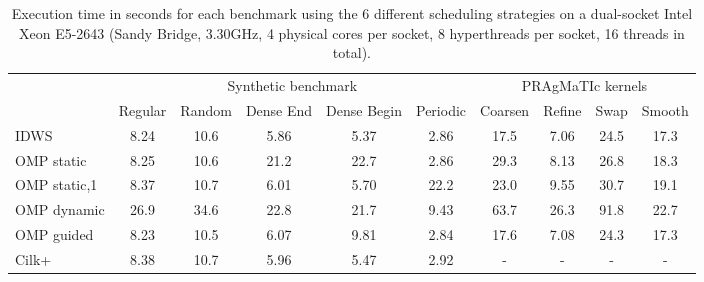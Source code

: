 \documentclass{acm_proc_article-sp}
\newcommand{\PRAGMATIC}{PRAgMaTIc\xspace}
\begin{document}
\begin{table*}[h]
\begin{center}
\begin{tabular}[c]{|l|c|c|c|c|c||c|c|c|c|}
\cline{2-10}
\multicolumn{1}{c|}{}	& \multicolumn{5}{|c||}{Synthetic benchmark}		& \multicolumn{4}{c|}{\PRAGMATIC kernels}	\\ \cline{2-10}
\multicolumn{1}{c|}{}	& Regular	& Random	& Dense End	& Dense Begin	& Periodic	& Coarsen	& Refine	& Swap	& Smooth \\ \hline
IDWS					& 8.24		& 10.6		& 5.86		& 5.37			& 2.86		& 17.5		& 7.06		& 24.5	& 17.3   \\ \hline
OMP static				& 8.25		& 10.6		& 21.2		& 22.7			& 2.86		& 29.3		& 8.13		& 26.8	& 18.3   \\ \hline
OMP static,1			& 8.37		& 10.7		& 6.01		& 5.70			& 22.2		& 23.0		& 9.55		& 30.7	& 19.1   \\ \hline
OMP dynamic				& 26.9		& 34.6		& 22.8		& 21.7			& 9.43		& 63.7		& 26.3		& 91.8	& 22.7   \\ \hline
OMP guided				& 8.23		& 10.5		& 6.07		& 9.81			& 2.84		& 17.6		& 7.08		& 24.3	& 17.3   \\ \hline
Cilk+					& 8.38		& 10.7		& 5.96		& 5.47			& 2.92		& -			& -			& -		& -      \\ \hline
\end{tabular}
\caption{Execution time in seconds for each benchmark using the 6 different 
scheduling strategies on a dual-socket Intel Xeon E5-2643 (Sandy Bridge, 
3.30GHz, 4 physical cores per socket, 8 hyperthreads per socket, 16 threads in 
total).}
\label{tab:performance_badger}
\end{center}
\end{table*}
\end{document}
